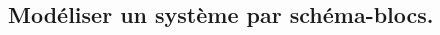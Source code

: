 \documentclass[10pt,fleqn]{book}
\newcommand{\repRel}{../..}
\newcommand{\repStyle}{\repRel/Style}
\newcommand{\td}{fichier_td}
\newcommand{\repExos}{\repRel/ExercicesCompetences}
\newcommand{\repExo}{dossier}
\begin{document}
\begin{multicols}{2} 

\renewcommand{\repExo}{\repExos/B2_ProposerModele/B2_06_ModeleComportement/502_Divers}
\renewcommand{\td}{502_Divers}
\graphicspath{{\repStyle/png/}{\repExo/images/}}


\renewcommand{\repExo}{\repExos/B2_ProposerModele/B2_06_ModeleComportement/503_Divers}
\renewcommand{\td}{503_Divers}
\graphicspath{{\repStyle/png/}{\repExo/images/}}


\renewcommand{\repExo}{\repExos/B2_ProposerModele/B2_06_ModeleComportement/504_Divers}
\renewcommand{\td}{504_Divers}
\graphicspath{{\repStyle/png/}{\repExo/images/}}


\renewcommand{\repExo}{\repExos/B2_ProposerModele/B2_06_ModeleComportement/506_Divers}
\renewcommand{\td}{506_Divers}
\graphicspath{{\repStyle/png/}{\repExo/images/}}


\end{multicols}

\subsection{Modéliser un système par schéma-blocs. } 
\end{document}
